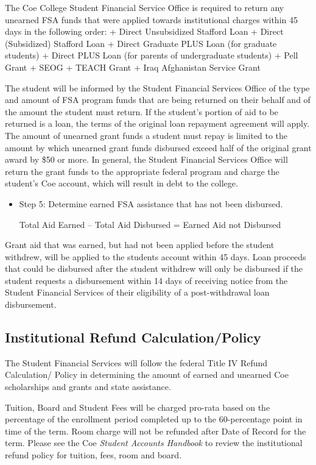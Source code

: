 \documentclass[
  letterpaper,
]{scrbook}
\begin{document}
The Coe College Student Financial Service Office is required to return
any unearned FSA funds that were applied towards institutional charges
within 45 days in the following order: + Direct Unsubsidized Stafford
Loan + Direct (Subsidized) Stafford Loan + Direct Graduate PLUS Loan
(for graduate students) + Direct PLUS Loan (for parents of undergraduate
students) + Pell Grant + SEOG + TEACH Grant + Iraq Afghanistan Service
Grant

The student will be informed by the Student Financial Services Office of
the type and amount of FSA program funds that are being returned on
their behalf and of the amount the student must return. If the student's
portion of aid to be returned is a loan, the terms of the original loan
repayment agreement will apply. The amount of unearned grant funds a
student must repay is limited to the amount by which unearned grant
funds disbursed exceed half of the original grant award by \$50 or more.
In general, the Student Financial Services Office will return the grant
funds to the appropriate federal program and charge the student's Coe
account, which will result in debt to the college.

\begin{itemize}
\item
  Step 5: Determine earned FSA assistance that has not been disbursed.

  Total Aid Earned -- Total Aid Disbursed = Earned Aid not Disbursed
\end{itemize}

Grant aid that was earned, but had not been applied before the student
withdrew, will be applied to the students account within 45 days. Loan
proceeds that could be disbursed after the student withdrew will only be
disbursed if the student requests a disbursement within 14 days of
receiving notice from the Student Financial Services of their
eligibility of a post-withdrawal loan disbursement.

\subsection{Institutional Refund
Calculation/Policy}\label{institutional-refund-calculationpolicy}

The Student Financial Services will follow the federal Title IV Refund
Calculation/ Policy in determining the amount of earned and unearned Coe
scholarships and grants and state assistance.

Tuition, Board and Student Fees will be charged pro-rata based on the
percentage of the enrollment period completed up to the 60-percentage
point in time of the term. Room charge will not be refunded after Date
of Record for the term. Please see the Coe \emph{Student Accounts
Handbook} to review the institutional refund policy for tuition, fees,
room and board.
\end{document}
